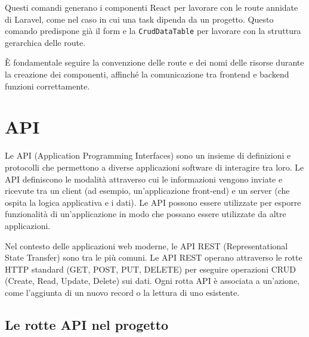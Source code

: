 Questi comandi generano i componenti React per lavorare con le route annidate di Laravel, come nel caso in cui una task dipenda da un progetto. Questo comando predispone già il form e la \texttt{CrudDataTable} per lavorare con la struttura gerarchica delle route.

È fondamentale seguire la convenzione delle route e dei nomi delle risorse durante la creazione dei componenti, affinché la comunicazione tra frontend e backend funzioni correttamente.
\section{API}\label{sec:laravel_api}

Le API (Application Programming Interfaces) sono un insieme di definizioni e protocolli che permettono a diverse applicazioni software di interagire tra loro. Le API definiscono le modalità attraverso cui le informazioni vengono inviate e ricevute tra un client (ad esempio, un'applicazione front-end) e un server (che ospita la logica applicativa e i dati). Le API possono essere utilizzate per esporre funzionalità di un'applicazione in modo che possano essere utilizzate da altre applicazioni.

Nel contesto delle applicazioni web moderne, le API REST (Representational State Transfer) sono tra le più comuni. Le API REST operano attraverso le rotte HTTP standard (GET, POST, PUT, DELETE) per eseguire operazioni CRUD (Create, Read, Update, Delete) sui dati. Ogni rotta API è associata a un'azione, come l'aggiunta di un nuovo record o la lettura di uno esistente.

\subsection{Le rotte API nel progetto}

